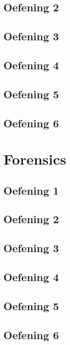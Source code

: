 \documentclass[a4paper,11pt]{report}
\begin{document}
\section{Oefening 2}

\section{Oefening 3}

\section{Oefening 4}

\section{Oefening 5}

\section{Oefening 6}


\newpage

\chapter{Forensics}
\section{Oefening 1}

\section{Oefening 2}

\section{Oefening 3}

\section{Oefening 4}

\section{Oefening 5}

\section{Oefening 6}

\end{document}

